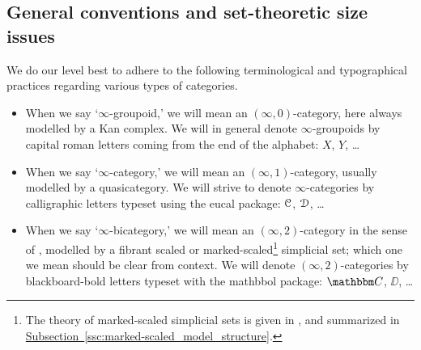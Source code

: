 \documentclass[main.tex]{subfiles}
\begin{document}
\subsection{General conventions and set-theoretic size issues}
\label{ssc:general_conventions}

We do our level best to adhere to the following terminological and typographical practices regarding various types of categories.
\begin{itemize}
  \item When we say `$\infty$-groupoid,' we will mean an $(\infty, 0)$-category, here always modelled by a Kan complex. We will in general denote $\infty$-groupoids by capital roman letters coming from the end of the alphabet: $X$, $Y$, \dots

  \item When we say `$\infty$-category,' we will mean an $(\infty, 1)$-category, usually modelled by a quasicategory. We will strive to denote $\infty$-categories by calligraphic letters typeset using the \textsf{eucal} package: $\mathcal{C}$, $\mathcal{D}$, \dots

  \item When we say `$\infty$-bicategory,' we will mean an $(\infty, 2)$-category in the sense of \cite{lurie2009infinity}, modelled by a fibrant scaled or marked-scaled\footnote{The theory of marked-scaled simplicial sets is given in \cite{garcia2cartesianfibrationsii}, and summarized in \hyperref[ssc:marked-scaled_model_structure]{Subsection~\ref*{ssc:marked-scaled_model_structure}}.} simplicial set; which one we mean should be clear from context. We will denote $(\infty, 2)$-categories by blackboard-bold letters typeset with the \textsf{mathbbol} package: $\CC$, $\DD$, \dots
\end{itemize}
\end{document}
